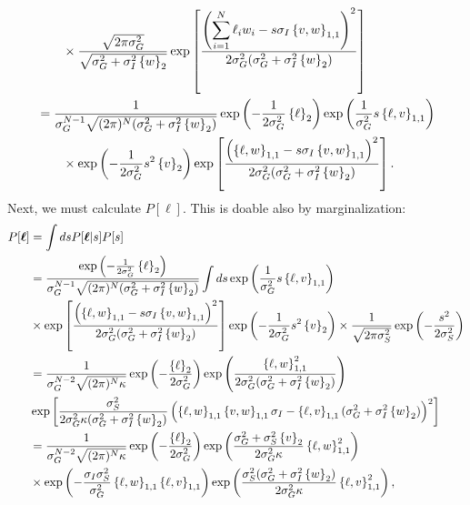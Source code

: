 \documentclass[11pt]{article}
\begin{document}
\begin{align}
	&\qquad \times \frac{\sqrt{2\pi \sigma_G^2}}{\sqrt{\sigma_G^2 + \sigma_I^2 \left\{w\right\}_2}}\exp\left[\frac{\left(\displaystyle\sum_{i=1}^N \ell_i w_i - s \sigma_I \left\{v,w\right\}_{1,1}\right)^2}{2 \sigma_G^2 (\sigma_G^2 + \sigma_I^2 \left\{w\right\}_2)}\right] \\
	&= \frac{1}{\sigma_G^{N-1}\sqrt{(2\pi)^N(\sigma_G^2 + \sigma_I^2 \left\{w\right\}_2)}}\exp\left(-\frac{1}{2\sigma_G^2}\left\{\ell \right\}_2\right)\exp\left(\frac{1}{\sigma_G^2} s\left\{\ell, v\right\}_{1,1}\right) \notag \\
	&\qquad \times \exp\left(-\frac{1}{2\sigma_G^2}s^2 \left\{v\right\}_2\right)\exp\left[\frac{\left(\left\{\ell, w\right\}_{1,1} - s \sigma_I \left\{v,w\right\}_{1,1}\right)^2}{2\sigma_G^2 (\sigma_G^2 + \sigma_I^2 \left\{w\right\}_2)}\right].
\end{align}
Next, we must calculate $P[\boldsymbol{\ell}]$. This is doable also by marginalization:
\begin{align}
	P[\boldsymbol{\ell}] &= \int ds P[\boldsymbol{\ell}|s] P[s] \\
	&= \frac{\exp\left(-\frac{1}{2\sigma_G^2}\left\{\ell \right\}_2\right)}{\sigma_G^{N-1}\sqrt{(2\pi)^N(\sigma_G^2 + \sigma_I^2 \left\{w\right\}_2)}} \int ds \exp\left(\frac{1}{\sigma_G^2} s\left\{\ell, v\right\}_{1,1}\right) \\
	&\times \exp\left[\frac{\left(\left\{\ell, w\right\}_{1,1} - s \sigma_I \left\{v,w\right\}_{1,1}\right)^2}{2\sigma_G^2 (\sigma_G^2 + \sigma_I^2 \left\{w\right\}_2)}\right]\exp\left(-\frac{1}{2\sigma_G^2}s^2 \left\{v\right\}_2\right)\times \frac{1}{\sqrt{2\pi \sigma_S^2}} \exp\left(-\frac{s^2}{2\sigma_S^2}\right) \\
	&= \frac{1}{\sigma_G^{N-2}\sqrt{(2\pi)^N \kappa}} \exp\left(-\frac{\left\{\ell \right\}_2}{2\sigma_G^2}\right)\exp\left(\frac{\left\{\ell,w\right\}_{1,1}^2}{2 \sigma_G^2(\sigma_G^2 + \sigma_I^2 \left\{w\right\}_2) }\right)    \notag \\
	&\exp\left[\frac{\sigma_S^2}{2\sigma_G^2 \kappa (\sigma_G^2 + \sigma_I^2 \left\{w\right\}_2)} \left(\left\{\ell,w\right\}_{1,1} \left\{v,w\right\}_{1,1} \sigma_I - \left\{\ell, v\right\}_{1,1} (\sigma_G^2 +\sigma_I^2 \left\{w\right\}_2)\right)^2\right] \\
	&= \frac{1}{\sigma_G^{N-2}\sqrt{(2\pi)^N \kappa}}  \exp\left(-\frac{\left\{\ell \right\}_2}{2\sigma_G^2}\right) \exp\left( \frac{\sigma_G^2 + \sigma_S^2 \left\{v\right\}_2}{2 \sigma_G^2 \kappa} \left\{\ell, w\right\}_{1,1}^2\right) \notag \\
	& \times \exp\left(-\frac{\sigma_I \sigma_S^2}{\sigma_G^2} \left\{\ell, w\right\}_{1,1} \left\{\ell, v\right\}_{1,1} \right) \exp\left(\frac{\sigma_S^2 (\sigma_G^2 + \sigma_I^2 \left\{w\right\}_2)}{2 \sigma_G^2 \kappa} \left\{\ell, v\right\}_{1,1}^2\right),
\end{align}
\end{document}

